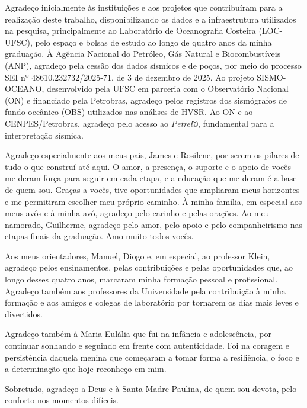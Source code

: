 \begin{agradecimentos}
Agradeço inicialmente às instituições e aos projetos que contribuíram para a realização deste trabalho, disponibilizando os dados e a infraestrutura utilizados na pesquisa, principalmente ao Laboratório de Oceanografia Costeira (LOC-UFSC), pelo espaço e bolsas de estudo ao longo de quatro anos da minha graduação. À Agência Nacional do Petróleo, Gás Natural e Biocombustíveis (ANP), agradeço pela cessão dos dados sísmicos e de poços, por meio do processo SEI nº 48610.232732/2025-71, de 3 de dezembro de 2025. Ao projeto SISMO-OCEANO, desenvolvido pela UFSC em parceria com o Observatório Nacional (ON) e financiado pela Petrobras, agradeço pelos registros dos sismógrafos de fundo oceânico (OBS) utilizados nas análises de HVSR. Ao ON e ao CENPES/Petrobras, agradeço pelo acesso ao \textit{Petrel}®, fundamental para a interpretação sísmica.

Agradeço especialmente aos meus pais, James e Rosilene, por serem os pilares de tudo o que construí até aqui. O amor, a presença, o suporte e o apoio de vocês me deram força para seguir em cada etapa, e a educação que me deram é a base de quem sou. Graças a vocês, tive oportunidades que ampliaram meus horizontes e me permitiram escolher meu próprio caminho. À minha família, em especial aos meus avôs e à minha avó, agradeço pelo carinho e pelas orações. Ao meu namorado, Guilherme, agradeço pelo amor, pelo apoio e pelo companheirismo nas etapas finais da graduação. Amo muito todos vocês.

Aos meus orientadores, Manuel, Diogo e, em especial, ao professor Klein, agradeço pelos ensinamentos, pelas contribuições e pelas oportunidades que, ao longo desses quatro anos, marcaram minha formação pessoal e profissional. Agradeço também aos professores da Universidade pela contribuição à minha formação e aos amigos e colegas de laboratório por tornarem os dias mais leves e divertidos.

Agradeço também à Maria Eulália que fui na infância e adolescência, por continuar sonhando e seguindo em frente com autenticidade. Foi na coragem e persistência daquela menina que começaram a tomar forma a resiliência, o foco e a determinação que hoje reconheço em mim.

Sobretudo, agradeço a Deus e à Santa Madre Paulina, de quem sou devota, pelo conforto nos momentos difíceis.
\end{agradecimentos}
